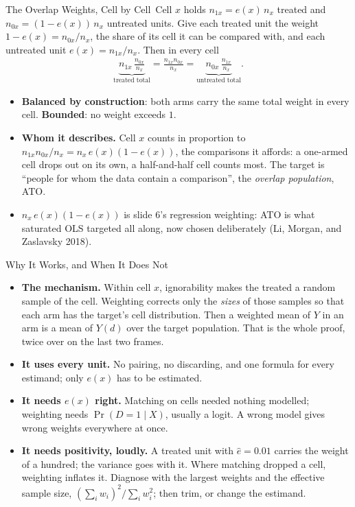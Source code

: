 \documentclass[aspectratio=169,11pt,xcolor=dvipsnames]{beamer}
\newcommand{\srcp}[1]{{\scriptsize\color{gray}(#1)}}
\newcommand{\core}{\,\raisebox{0.6pt}{\textcolor{corestar}{$\bigstar$}}}
\begin{document}
\begin{frame}{The Overlap Weights, Cell by Cell\core}
Cell $x$ holds $n_{1x} = e(x)\,n_x$ treated and $n_{0x} = (1-e(x))\,n_x$
untreated units. Give each treated unit the weight $1 - e(x) = n_{0x}/n_x$,
the share of its cell it can be compared with, and each untreated unit
$e(x) = n_{1x}/n_x$. Then in every cell
\begin{align*}
  \underbrace{n_{1x}\,\tfrac{n_{0x}}{n_x}}_{\text{treated total}}
  = \frac{n_{1x}n_{0x}}{n_x}
  = \underbrace{n_{0x}\,\tfrac{n_{1x}}{n_x}}_{\text{untreated total}} .
\end{align*}
\vspace{-6pt}
\begin{itemize}\itemsep2pt
  \item \textbf{Balanced by construction}: both arms carry the same total
        weight in every cell. \textbf{Bounded}: no weight exceeds $1$.
  \item \textbf{Whom it describes.} Cell $x$ counts in proportion to
        $n_{1x}n_{0x}/n_x = n_x\,e(x)(1-e(x))$, the comparisons it affords: a
        one-armed cell drops out on its own, a half-and-half cell counts most.
        The target is ``people for whom the data contain a comparison'', the
        \emph{overlap population}, ATO.
  \item $n_x\,e(x)(1-e(x))$ is slide 6's regression weighting: ATO is what
        saturated OLS targeted all along, now chosen deliberately
        \srcp{Li, Morgan, and Zaslavsky 2018}.
\end{itemize}
\end{frame}

\begin{frame}{Why It Works, and When It Does Not\core}
\begin{itemize}\itemsep3pt
  \item \textbf{The mechanism.} Within cell $x$, ignorability makes the treated
        a random sample of the cell. Weighting corrects only the \emph{sizes}
        of those samples so that each arm has the target's cell distribution.
        Then a weighted mean of $Y$ in an arm is a mean of $Y(d)$ over the
        target population. That is the whole proof, twice over on the last two
        frames.
  \item \textbf{It uses every unit.} No pairing, no discarding, and one
        formula for every estimand; only $e(x)$ has to be estimated.
  \item \textbf{It needs $e(x)$ right.} Matching on cells needed nothing
        modelled; weighting needs $\Pr(D = 1\mid X)$, usually a logit. A wrong
        model gives wrong weights everywhere at once.
  \item \textbf{It needs positivity, loudly.} A treated unit with
        $\hat e = 0.01$ carries the weight of a hundred; the variance goes with
        it. Where matching dropped a cell, weighting inflates it. Diagnose with
        the largest weights and the effective sample size,
        $(\sum_i w_i)^2/\sum_i w_i^2$; then trim, or change the estimand.
\end{itemize}
\end{frame}
\end{document}
